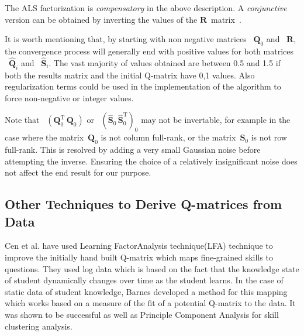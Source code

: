 The ALS factorization is \textit{compensatory} in the above description.  A \textit{conjunctive} version can be obtained by inverting the values of the $\mathbf{R}$~matrix~\cite{Desmarais2012b}.  

It is worth mentioning that, by starting with non negative matrices ~$\mathbf{{Q}}_0$ and ~$\mathbf{R}$, the convergence process will generally end with positive values for both matrices ~$\mathbf{\hat{Q}}_i$ and ~$\mathbf{\hat{S}}_i$. The vast majority of values obtained are between 0.5 and 1.5 if both the results matrix and the initial Q-matrix have {0,1} values. Also regularization terms could be used in the implementation of the algorithm to force non-negative or integer values.

Note that ~$(\mathbf{Q}_0^{\mathrm{T}} \, \mathbf{Q}_0)$ or ~$(\mathbf{\hat{S}}_0 \,
\mathbf{\hat{S}}_0^{\mathrm{T}})_0$ may not be invertable, for example in the case where the
matrix~$\mathbf{Q}_0$ is not column full-rank, or the matrix~$\mathbf{S}_0$ is not row full-rank.  This is
resolved by adding a very small Gaussian noise before attempting the inverse.  Ensuring the choice of a
relatively insignificant noise does not affect the end result for our purpose. 


\subsection{Other Techniques to Derive Q-matrices from Data}

\DIFdelbegin %

\DIFdelend Cen et al. \citep{Cen2005,Cen2006} have used Learning FactorAnalysis technique(LFA) technique to improve the initially hand built Q-matrix which maps fine-grained skills to questions. They used log data which is based on the fact that the knowledge state of student dynamically changes over time as the student learns. In the case of static data of student knowledge, Barnes \citep{Barnes06} developed a method for this mapping which works based on a measure of the fit of a potential Q-matrix to the data. It was shown to be successful as well as Principle Component Analysis for skill clustering analysis.


